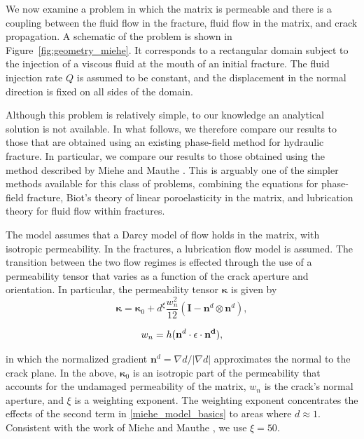 We now examine a problem in which the matrix is permeable and there is a coupling between the fluid flow in the fracture, fluid flow in the matrix, and crack propagation.  A schematic of the problem is shown in Figure~\ref{fig:geometry_miehe}.   It corresponds to a rectangular domain subject to the injection of a viscous fluid at the mouth of an initial fracture.  The fluid injection rate $Q$ is assumed to be constant, and the displacement in the normal direction is fixed on all sides of the domain.  

Although this problem is relatively simple, to our knowledge an analytical solution is not available.  In what follows, we therefore compare our results to those that are obtained using an existing phase-field method for hydraulic fracture.  In particular, we compare our results to those obtained using the method described by Miehe and Mauthe \cite{miehe2015minimization, miehe2016phase}.  This is arguably one of the simpler methods available for this class of problems, combining the equations for phase-field fracture, Biot's theory of linear poroelasticity in the matrix, and lubrication theory for fluid flow within fractures.

The model assumes that a Darcy model of flow holds in the matrix, with isotropic permeability.  In the fractures, a lubrication flow model is assumed.  The transition between the two flow regimes is effected through the use of a permeability tensor that varies as a function of the crack aperture and orientation.  In particular, the permeability tensor ${\boldsymbol{\kappa}}$ is given by
\begin{equation}\label{miehe_model_basics}
    \boldsymbol{\kappa} = \boldsymbol{\kappa}_0 + d^\xi\dfrac{w^2_n}{12}\left(\textbf{I} - \textbf{n}^d \otimes \textbf{n}^d \right),
\end{equation}

\begin{equation}\label{miehe_model_aperture}
    w_n = h (\textbf{n}^d \cdot \bf{\epsilon} \cdot \textbf{n}^d),
\end{equation}

\noindent in which the normalized gradient $\textbf{n}^d = \nabla d/|\nabla d|$ approximates the normal to the crack plane.   In the above, $\boldsymbol{\kappa}_0$ is an isotropic part of the permeability that accounts for the undamaged permeability of the matrix, $w_n$ is the crack's normal aperture, and $\xi$ is a weighting exponent.  The weighting exponent concentrates the effects of the second term in \ref{miehe_model_basics} to areas where $d \approx 1$. Consistent with the work of Miehe and Mauthe \cite{miehe2015minimization, miehe2016phase}, we use $\xi= 50$.

